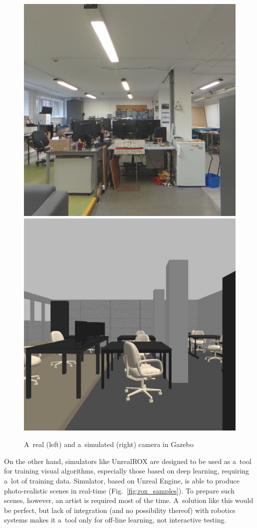 \documentclass[conference]{ieeetran}
\begin{document}
\begin{figure}[!ht]
    \includegraphics[width=0.494\columnwidth]{img/gazebo_vs_real/real.jpg}\hfill%
    \includegraphics[width=0.494\columnwidth]{img/gazebo_vs_real/gazebo.jpg}
    \caption{A~real (left) and a~simulated (right) camera in Gazebo}
    \label{fig:gazebo_vs_real}
\end{figure}

On the other hand, simulators like UnrealROX are designed to be used as a~tool for training visual algorithms,
especially those based on deep learning, requiring a~lot of training data. Simulator, based on Unreal Engine, 
is able to produce photo-realistic scenes in real-time (Fig.~\ref{fig:rox_samples}). 
To prepare such scenes, 
however, an artist is required most of the time. A~solution like this would be perfect, but lack of integration 
(and no possibility thereof) with robotics systems makes it a~tool only for off-line learning, not interactive
testing.
\end{document}
